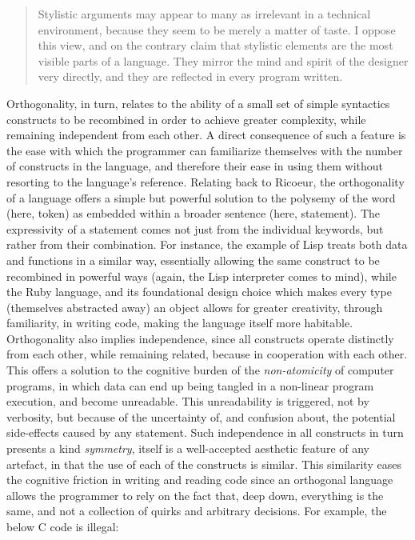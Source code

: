 \documentclass{article}
\begin{document}
\begin{quote}
  Stylistic arguments may appear to many as irrelevant in a technical environment, because they seem to be merely a matter of taste. I oppose this view, and on the contrary claim that stylistic elements are the most visible parts of a language. They mirror the mind and spirit of the designer very directly, and they are reflected in every program written.\cite{wirth_essence_2003}
\end{quote}

Orthogonality, in turn, relates to the ability of a small set of simple syntactics constructs to be recombined in order to achieve greater complexity, while remaining independent from each other. A direct consequence of such a feature is the ease with which the programmer can familiarize themselves with the number of constructs in the language, and therefore their ease in using them without resorting to the language's reference. Relating back to Ricoeur, the orthogonality of a language offers a simple but powerful solution to the polysemy of the word (here, token) as embedded within a broader sentence (here, statement). The expressivity of a statement comes not just from the individual keywords, but rather from their combination. For instance, the example of Lisp treats both data and functions in a similar way, essentially allowing the same construct to be recombined in powerful ways (again, the Lisp interpreter comes to mind), while the Ruby language, and its foundational design choice which makes every type (themselves abstracted away) an object allows for greater creativity, through familiarity, in writing code, making the language itself more habitable. Orthogonality also implies independence, since all constructs operate distinctly from each other, while remaining related, because in cooperation with each other. This offers a solution to the cognitive burden of the \emph{non-atomicity} of computer programs, in which data can end up being tangled in a non-linear program execution, and become unreadable. This unreadability is triggered, not by verbosity, but because of the uncertainty of, and confusion about, the potential side-effects caused by any statement. Such independence in all constructs in turn presents a kind \emph{symmetry}, itself is a well-accepted aesthetic feature of any artefact, in that the use of each of the constructs is similar. This similarity eases the cognitive friction in writing and reading code since an orthogonal language allows the programmer to rely on the fact that, deep down, everything is the same, and not a collection of quirks and arbitrary decisions. For example, the below C code is illegal:
\end{document}
